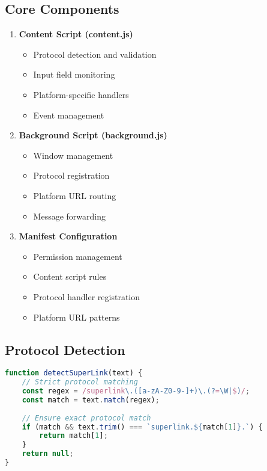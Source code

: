 \documentclass[12pt]{article}
\begin{document}
\subsection{Core Components}
\begin{enumerate}[leftmargin=*]
    \item \textbf{Content Script (content.js)}
    \begin{itemize}
        \item Protocol detection and validation
        \item Input field monitoring
        \item Platform-specific handlers
        \item Event management
    \end{itemize}
    
    \item \textbf{Background Script (background.js)}
    \begin{itemize}
        \item Window management
        \item Protocol registration
        \item Platform URL routing
        \item Message forwarding
    \end{itemize}
    
    \item \textbf{Manifest Configuration}
    \begin{itemize}
        \item Permission management
        \item Content script rules
        \item Protocol handler registration
        \item Platform URL patterns
    \end{itemize}
\end{enumerate}

\subsection{Protocol Detection}
\begin{codebox}
\begin{lstlisting}[language=JavaScript]
function detectSuperLink(text) {
    // Strict protocol matching
    const regex = /superlink\.([a-zA-Z0-9-]+)\.(?=\W|$)/;
    const match = text.match(regex);
    
    // Ensure exact protocol match
    if (match && text.trim() === `superlink.${match[1]}.`) {
        return match[1];
    }
    return null;
}
\end{lstlisting}
\end{codebox}
\end{document}
